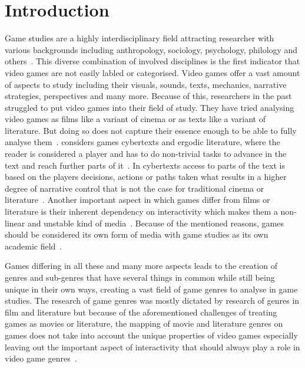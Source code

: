 \documentclass[11pt, a4paper]{article}
\begin{document}
\clearpage\section{Introduction}\label{sec:introduction}
Game studies are a highly interdisciplinary field attracting researcher with various backgrounds including anthropology,
sociology, psychology, philology and others~\parencite{Aarseth2001}.
This diverse combination of involved disciplines is the first indicator that video games are not easily labled or
categorised.
Video games offer a vast amount of aspects to study including their visuals, sounds, texts, mechanics, narrative
strategies, perspectives and many more.
Because of this, researchers in the past struggled to put video games into their field of study.
They have tried analysing video games as films like a variant of cinema or as texts like a variant of literature.
But doing so does not capture their essence enough to be able to fully analyse them~\parencite{Aarseth2001}.
\cite{Aarseth1997} considers games cybertexts and ergodic literature, where the reader is considered a player and
has to do non-trivial tasks to advance in the text and reach further parts of it~\parencite[1, 4]{Aarseth1997}.
In cybertexts access to parts of the text is based on the players decisions, actions or paths taken what
results in a higher degree of narrative control that is not the case for traditional cinema or
literature~\parencite[3-4]{Aarseth1997}.
Another important aspect in which games differ from films or literature is their inherent dependency on interactivity
which makes them a non-linear and unstable kind of media~\parencite[6-7]{Apperley2006}.
Because of the mentioned reasons, games should be considered its own form of media with game studies as its own
academic field~\parencite{Aarseth2001}.

Games differing in all these and many more aspects leads to the creation of genres and sub-genres
that have several things in common while still being unique in their own ways, creating a vast
field of game genres to analyse in game studies.
The research of game genres was mostly dictated by research of genres in film and literature but
because of the aforementioned challenges of treating games as movies or literature, the mapping of
movie and literature genres on games does not take into account the unique properties of video
games especially leaving out the important aspect of interactivity that should always play a role
in video game genres~\parencite[7]{Apperley2006}.
\end{document}
